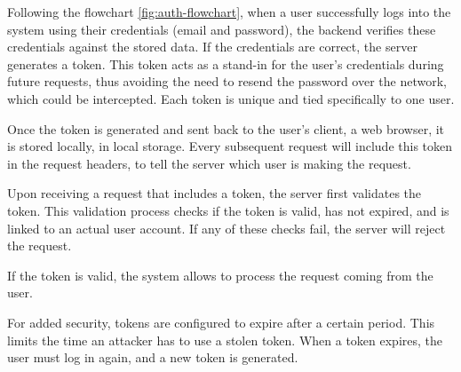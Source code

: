 Following the flowchart \ref{fig:auth-flowchart}, when a user successfully logs into the system using their credentials (email and password), the backend 
verifies these credentials against the stored data. If the credentials are correct, the server generates a token. 
This token acts as a stand-in for the user's credentials during future requests, thus avoiding the need to resend 
the password over the network, which could be intercepted. Each token is unique and tied specifically to one user.

Once the token is generated and sent back to the user's client, a web browser, it is stored locally, in local storage. 
Every subsequent request will include this token in the request headers, to tell the server which user is making 
the request.

Upon receiving a request that includes a token, the server first validates the token. This validation process checks 
if the token is valid, has not expired, and is linked to an actual user account. If any of these checks fail, 
the server will reject the request.

If the token is valid, the system allows to process the request coming from the user.

For added security, tokens are configured to expire after a certain period. This limits the time an attacker has to 
use a stolen token. When a token expires, the user must log in again, and a new token is generated.

